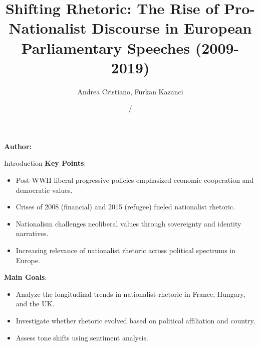 \documentclass[8pt]{beamer}
\title[Boğazici University]{Shifting Rhetoric: The Rise of Pro-Nationalist Discourse in European Parliamentary Speeches (2009-2019)}
\author[Name Surname]{Andrea Cristiano, Furkan Kazanci}
\institute[]{Boğazici University}
\date{\currentyear/\nextyear} %
\begin{document}
\begin{frame}{}
\vspace{\fill}



\vspace{\fill}

\Large
\color{main}
\inserttitle

\medskip

\large
\color{black}
\insertsubtitle

\vspace{\fill}

\footnotesize
\insertinstitute

\vspace{\fill}

\textbf{Author:} \insertauthor

\medskip

\insertdate

\vspace{\fill}
\end{frame}


\begin{frame}[allowframebreaks]{Introduction}
\small
\textbf{Key Points}: 
\begin{itemize}
    \item Post-WWII liberal-progressive policies emphasized economic cooperation and democratic values.
    \item Crises of 2008 (financial) and 2015 (refugee) fueled nationalist rhetoric.
    \item Nationalism challenges neoliberal values through sovereignty and identity narratives.
    \item Increasing relevance of nationalist rhetoric across political spectrums in Europe.
\end{itemize}

\textbf{Main Goals}:
\begin{itemize}
    \item Analyze the longitudinal trends in nationalist rhetoric in France, Hungary, and the UK.
    \item Investigate whether rhetoric evolved based on political affiliation and country.
    \item Assess tone shifts using sentiment analysis.
\end{itemize}

\end{frame}
\end{document}
